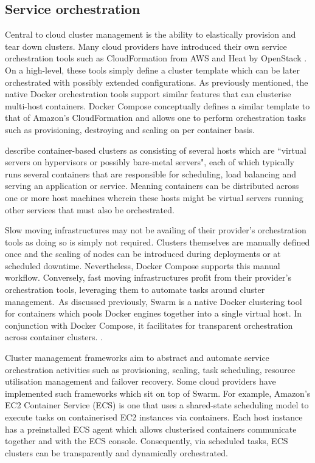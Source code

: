\documentclass{article}
\begin{document}
\subsection{Service orchestration}
Central to cloud cluster management is the ability to elastically provision and tear down clusters. Many cloud providers have introduced their own service orchestration tools such as CloudFormation from AWS and Heat by OpenStack \citep{Dudouet}. 
On a high-level, these tools simply define a cluster template which can be later orchestrated with possibly extended configurations. As previously mentioned, the native Docker orchestration tools support similar features that can clusterise multi-host containers. Docker Compose conceptually defines a similar template to that of Amazon's CloudFormation and allows one to perform orchestration tasks such as provisioning, destroying and scaling on per container basis.
\par
\citet{Claus} describe container-based clusters as consisting of several hosts which are ``virtual servers on hypervisors or possibly bare-metal servers", each of which typically runs several containers that are responsible for scheduling, load balancing and serving an application or service. Meaning containers can be distributed across one or more host machines wherein these hosts might be virtual servers running other services that must also be orchestrated.
\par
Slow moving infrastructures may not be availing of their provider's orchestration tools as doing so is simply not required. Clusters themselves are manually defined once and the scaling of nodes can be introduced during deployments or at scheduled downtime. Nevertheless, Docker Compose supports this manual workflow. Conversely, fast moving infrastructures profit from their provider's orchestration tools, leveraging them to automate tasks around cluster management.\ As discussed previously, Swarm is a native Docker clustering tool for containers which pools Docker engines together into a single virtual host. In conjunction with Docker Compose, it facilitates for transparent orchestration across container clusters. \citep{holla}.
\par
Cluster management frameworks aim to abstract and automate service orchestration activities such as provisioning, scaling, task scheduling, resource utilisation management and failover recovery. Some cloud providers have implemented such frameworks which sit on top of Swarm. For example, Amazon's EC2 Container Service (ECS) is one that uses a shared-state scheduling model to execute tasks on containerised EC2 instances via containers. Each host instance has a preinstalled ECS agent which allows clusterised containers communicate together and with the ECS console. Consequently, via scheduled tasks, ECS clusters can be transparently and dynamically orchestrated.
\end{document}

